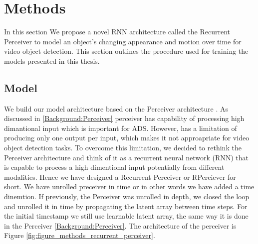 \section{Methods}  \label{Methods}

In this section We propose a novel RNN architecture called the Recurrent Perceiver to model an object's changing appearance and motion over time for video object detection.
This section outlines the procedure used for training the models presented in this thesis.


\subsection{Model} \label{Methods:Model}

We build our model architecture based on the Perceiver architecture \cite{jaeglePerceiverGeneralPerception2021}. As discussed in \ref{Background:Perceiver} perceiver has capability of processing high dimantional input which is important for ADS. However, has a limitation of producing only one output per input, which makes it not approapriate for video object detection tasks. To overcome this limitation, we decided to rethink the Perceiver architecture and think of it as a recurrent neural network (RNN) that is capable to process a high dimentional input potentially from different modalities. Hence we have designed a Recurrent Perceiver or RPerciever for short. We have unrolled preceiver in time or in other words we have added a time dinemtion. If previously, the Perceiver was unrolled in depth, we closed the loop and unrolled it in time by propagating the latent array between time steps. For the initial timestamp we still use learnable latent array, the same way it is done in the Perceiver \ref{Background:Perceiver}. The architecture of the perceiver is Figure \ref{fig:figure_methods_recurrent_perceiver}.



